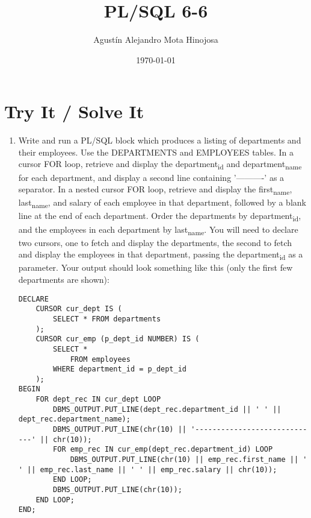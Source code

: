 \documentclass[11pt]{article}
\author{Agustín Alejandro Mota Hinojosa}
\date{\today}
\title{PL/SQL 6-6}
\begin{document}
\maketitle
\tableofcontents

\section{Try It / Solve It}
\label{sec:orgdca7a72}

\begin{enumerate}
\item Write and run a PL/SQL block which produces a listing of departments and their employees. Use the DEPARTMENTS and EMPLOYEES  tables. In a cursor FOR loop, retrieve and display the department\textsubscript{id} and department\textsubscript{name} for each department, and display a second line containing '----------' as a separator. In a nested cursor FOR loop, retrieve and display the first\textsubscript{name}, last\textsubscript{name}, and salary of each employee in that department, followed by a blank line at the end of each department. Order the departments by department\textsubscript{id}, and the employees in each department by last\textsubscript{name}. You will need to declare two cursors, one to fetch and display the departments, the second to fetch and display the employees in that department, passing the department\textsubscript{id} as a parameter. Your output should look something like this (only the first few departments are shown):
\begin{verbatim}
DECLARE
    CURSOR cur_dept IS (
        SELECT * FROM departments
    );
    CURSOR cur_emp (p_dept_id NUMBER) IS (
        SELECT *
            FROM employees
        WHERE department_id = p_dept_id
    );
BEGIN
    FOR dept_rec IN cur_dept LOOP
        DBMS_OUTPUT.PUT_LINE(dept_rec.department_id || ' ' || dept_rec.department_name);
        DBMS_OUTPUT.PUT_LINE(chr(10) || '-----------------------------' || chr(10));
        FOR emp_rec IN cur_emp(dept_rec.department_id) LOOP
            DBMS_OUTPUT.PUT_LINE(chr(10) || emp_rec.first_name || ' ' || emp_rec.last_name || ' ' || emp_rec.salary || chr(10));
        END LOOP;
        DBMS_OUTPUT.PUT_LINE(chr(10));
    END LOOP;
END;
\end{verbatim}


\end{enumerate}
\end{document}
